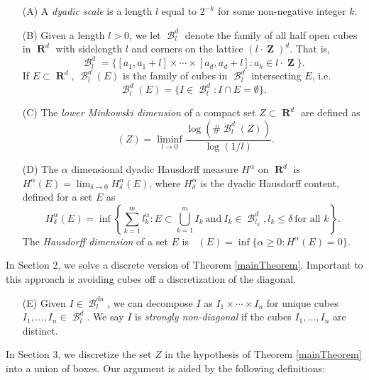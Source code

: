 \documentclass[dvipsnames,letterpaper,12pt]{article}
\theoremstyle{plain}
\DeclareMathOperator{\hausdim}{\dim_{\mathbf{H}}}
\DeclareMathOperator{\lowminkdim}{\underline{\dim}_{\mathbf{M}}}
\DeclareMathOperator{\RR}{\mathbf{R}}
\DeclareMathOperator{\ZZ}{\mathbf{Z}}
\DeclareMathOperator{\B}{\mathcal{B}}
\begin{document}
\begin{enumerate}
	\item[(A)] A {\it dyadic scale} is a length $l$ equal to $2^{-k}$ for some non-negative integer $k$.

	\item[(B)] Given a length $l > 0$, we let $\B^d_l$  denote the family of all half open cubes in $\RR^d$ with sidelength $l$ and corners on the lattice $(l \cdot \ZZ)^d$. That is,
	\[ \B^d_l = \{ [a_1, a_1 + l] \times \cdots \times [a_d, a_d+l] : a_k \in l \cdot \ZZ \}. \]
	If $E \subset \RR^d$, $\B^d_l(E)$ is the family of cubes in $\B^d_l$ intersecting $E$, i.e.
	\[ \B^d_l(E) = \{ I \in \B^d_l: I \cap E = \emptyset \}. \]

	\item[(C)] The {\it lower Minkowski dimension} of a compact set $Z \subset \RR^d$ are defined as
	\begin{equation} \label{minkdimdef}
		\lowminkdim(Z) = \liminf_{l \to 0} \frac{\log(\# \B^d_l(Z))}{\log(1/l)}.
	\end{equation}

	\item[(D)] The $\alpha$ dimensional dyadic Hausdorff measure $H^\alpha$ on $\RR^d$ is $H^\alpha(E) = \lim_{\delta \to 0} H_\delta^\alpha(E)$, where $H^\alpha_\delta$ is the dyadic Hausdorff content, defined for a set $E$ as
	\[ H^\alpha_\delta(E) = \inf \left\{ \sum_{k = 1}^m l_k^\alpha : E \subset \bigcup_{k = 1}^m I_k\ \text{and}\ I_k \in \B^d_{l_k}, l_k \leq \delta\ \text{for all $k$} \right\}. \]
	The {\it Hausdorff dimension} of a set $E$ is $\hausdim(E) = \inf \{ \alpha \geq 0 : H^\alpha(E) = 0 \}$.
\end{enumerate}

In Section 2, we solve a discrete version of Theorem \ref{mainTheorem}. Important to this approach is avoiding cubes off a discretization of the diagonal.

\begin{enumerate}
	\item[(E)] Given $I \in \B^{dn}_l$, we can decompose $I$ as $I_1 \times \cdots \times I_n$ for unique cubes $I_1, \dots, I_n \in \B_l^d$. We say $I$ is {\it strongly non-diagonal} if the cubes $I_1, \dots, I_n$ are distinct.
\end{enumerate}

In Section 3, we discretize the set $Z$ in the hypothesis of Theorem \ref{mainTheorem} into a union of boxes. Our argument is aided by the following definitions:
\end{document}
